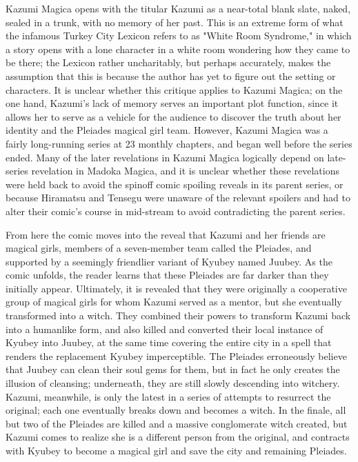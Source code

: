 Kazumi Magica opens with the titular Kazumi as a near-total blank slate, naked, sealed in a trunk, with no memory of her past. This is an extreme form of what the infamous Turkey City Lexicon \cite{ref104} refers to as "White Room Syndrome," in which a story opens with a lone character in a white room wondering how they came to be there; the Lexicon rather uncharitably, but perhaps accurately, makes the assumption that this is because the author has yet to figure out the setting or characters. It is unclear whether this critique applies to Kazumi Magica; on the one hand, Kazumi's lack of memory serves an important plot function, since it allows her to serve as a vehicle for the audience to discover the truth about her identity and the Pleiades magical girl team. However, Kazumi Magica was a fairly long-running series at 23 monthly chapters, and began well before the series ended. Many of the later revelations in Kazumi Magica logically depend on late-series revelation in Madoka Magica, and it is unclear whether these revelations were held back to avoid the spinoff comic spoiling reveals in its parent series, or because Hiramatsu and Tensegu were unaware of the relevant spoilers and had to alter their comic's course in mid-stream to avoid contradicting the parent series. 

From here the comic moves into the reveal that Kazumi and her friends are magical girls, members of a seven-member team called the Pleiades, and supported by a seemingly friendlier variant of Kyubey named Juubey. As the comic unfolds, the reader learns that these Pleiades are far darker than they initially appear. Ultimately, it is revealed that they were originally a cooperative group of magical girls for whom Kazumi served as a mentor, but she eventually transformed into a witch. They combined their powers to transform Kazumi back into a humanlike form, and also killed and converted their local instance of Kyubey into Juubey, at the same time covering the entire city in a spell that renders the replacement Kyubey imperceptible. The Pleiades erroneously believe that Juubey can clean their soul gems for them, but in fact he only creates the illusion of cleansing; underneath, they are still slowly descending into witchery. Kazumi, meanwhile, is only the latest in a series of attempts to resurrect the original; each one eventually breaks down and becomes a witch. In the finale, all but two of the Pleiades are killed and a massive conglomerate witch created, but Kazumi comes to realize she is a different person from the original, and contracts with Kyubey to become a magical girl and save the city and remaining Pleiades.

